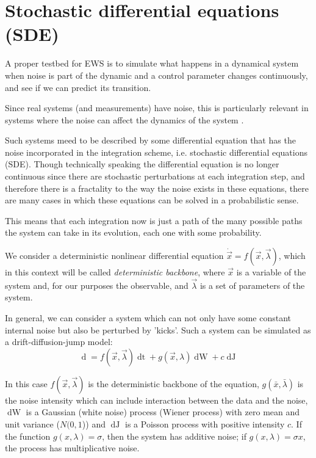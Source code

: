 
\section{Stochastic differential equations (SDE)}

A proper testbed for EWS is to  simulate what happens in a dynamical system when noise is part of the dynamic and a control parameter changes continuously,  and see if we can predict its transition.

Since real systems (and measurements) have noise, this is particularly relevant in systems where the noise can  affect the dynamics of the system \citep{Coulson2004}.

Such systems meed to  be described by some differential equation that has the noise incorporated in the integration scheme, i.e. stochastic differential equations (SDE). Though technically speaking the differential equation is no longer continuous since there are stochastic perturbations at each integration step, and therefore there is a fractality to the way the noise exists in these equations, there are  many cases in which these equations can be solved in a probabilistic sense. 


This means that each integration now is just a path of the many possible paths the system can take in its evolution, each one with some probability. 



We consider a deterministic nonlinear differential equation $\dot{\vec x}=f(\vec x,\vec \lambda)$, which in this context will be called \textit{deterministic backbone}, where $\vec x$ is a variable of the system and, for our purposes the observable, and $\vec \lambda$ is a set of parameters of the system.

In general, we can consider a system which can not only have some constant internal noise but also be perturbed by 'kicks'.
Such a system can be simulated as a drift-diffusion-jump model: 
\begin{equation}
	\mathop{d\vec x}=f(\vec x,\vec \lambda)\mathop{dt}+g(\vec x,\lambda)\mathop{dW}+c\mathop{dJ}
	\label{eq: SDE general}
\end{equation}

In this case $f(\vec x,\vec \lambda)$ is the deterministic backbone of the equation, $g(\bar x,\bar \lambda)$ is the noise intensity which can include interaction between the data and the noise, $\mathop{dW}$ is a Gaussian (white noise) process (Wiener process) with zero mean and unit variance ($N(0,1$)) and $\mathop{dJ}$ is a Poisson process with positive intensity $c$. 
If the function $g(x,\lambda)=\sigma$, then the system has additive noise; if $g(x,\lambda)=\sigma x$, the process has multiplicative noise.

